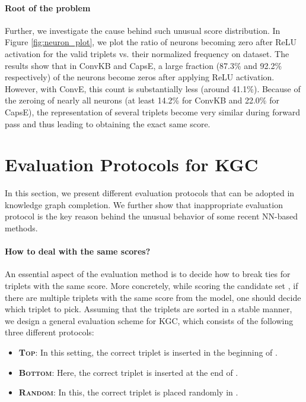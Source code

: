 \documentclass[11pt,a4paper]{article}
\begin{document}
\paragraph{Root of the problem}
Further, we investigate the cause behind such unusual score distribution. In Figure \ref{fig:neuron_plot}, we plot the ratio of neurons becoming zero after ReLU activation for the valid triplets vs. their normalized frequency on \datafb{} dataset. The results show that in ConvKB and CapsE, a large fraction (87.3\% and 92.2\% respectively) of the neurons become zeros after applying ReLU activation. However, with ConvE, this count is substantially less (around 41.1\%). Because of the zeroing of nearly all neurons (at least 14.2\% for ConvKB and 22.0\% for CapsE), the representation of several triplets become very similar during forward pass and thus leading to obtaining the exact same score. 




\section{Evaluation Protocols for KGC}
\label{sec:details}

In this section, we present different evaluation protocols that can be adopted 
in knowledge graph completion. We further show that inappropriate evaluation protocol is the key reason behind the unusual behavior of some recent NN-based methods.

\paragraph{How to deal with the same scores?}
An essential aspect of the evaluation method is to decide how to break ties for triplets with the same score. More concretely, while scoring the candidate set , if there are multiple triplets with the same score from the model, one should decide which triplet to pick. Assuming that the triplets are sorted in a stable manner, we design a general evaluation scheme for KGC, which consists of the following three different protocols:

\begin{itemize}
[itemsep=2pt,parsep=1pt,partopsep=1pt,leftmargin=*,topsep=1pt]
	\item \textbf{\textsc{Top}}: In this setting, the correct triplet is inserted in the beginning of .
	\item \textbf{\textsc{Bottom}}: Here, the correct triplet is inserted at the end of .
	\item \textbf{\textsc{Random}}: In this, the correct triplet is placed randomly in .
\end{itemize}
\end{document}
